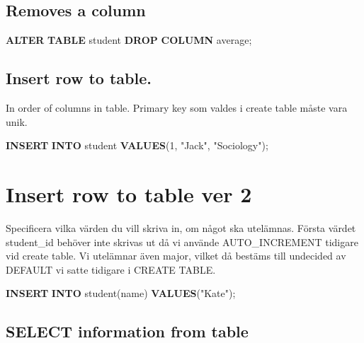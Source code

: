 \documentclass[
]{article}
\newenvironment{Shaded}{\begin{snugshade}}{\end{snugshade}}
\newcommand{\DecValTok}[1]{\textcolor[rgb]{0.00,0.00,0.81}{#1}}
\newcommand{\KeywordTok}[1]{\textcolor[rgb]{0.13,0.29,0.53}{\textbf{#1}}}
\newcommand{\NormalTok}[1]{#1}
\newcommand{\OtherTok}[1]{\textcolor[rgb]{0.56,0.35,0.01}{#1}}
\begin{document}
\subsection{Removes a column}\label{removes-a-column}

\begin{Shaded}
\begin{Highlighting}[]
\KeywordTok{ALTER} \KeywordTok{TABLE}\NormalTok{ student }\KeywordTok{DROP} \KeywordTok{COLUMN}\NormalTok{ average;}
\end{Highlighting}
\end{Shaded}

\subsection{Insert row to table.}\label{insert-row-to-table.}

In order of columns in table. Primary key som valdes i create table
måste vara unik.

\begin{Shaded}
\begin{Highlighting}[]
\KeywordTok{INSERT} \KeywordTok{INTO}\NormalTok{ student }\KeywordTok{VALUES}\NormalTok{(}\DecValTok{1}\NormalTok{, }\OtherTok{"Jack"}\NormalTok{, }\OtherTok{"Sociology"}\NormalTok{);}
\end{Highlighting}
\end{Shaded}

\section{Insert row to table ver 2}\label{insert-row-to-table-ver-2}

Specificera vilka värden du vill skriva in, om något ska utelämnas.
Första värdet student\_id behöver inte skrivas ut då vi använde
AUTO\_INCREMENT tidigare vid create table. Vi utelämnar även major,
vilket då bestäms till undecided av DEFAULT vi satte tidigare i CREATE
TABLE.

\begin{Shaded}
\begin{Highlighting}[]
\KeywordTok{INSERT} \KeywordTok{INTO}\NormalTok{ student(name) }\KeywordTok{VALUES}\NormalTok{(}\OtherTok{"Kate"}\NormalTok{);}
\end{Highlighting}
\end{Shaded}

\subsection{SELECT information from
table}\label{select-information-from-table}
\end{document}
